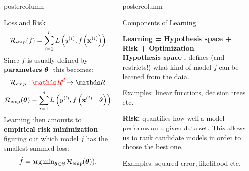 \documentclass{beamer}
\newlength{\columnheight} %
\begin{document}
\begin{frame}[fragile]{}
\begin{columns}
\begin{column}{.31\textwidth}
\begin{beamercolorbox}[center]{postercolumn}
\begin{minipage}{.98\textwidth}
{\begin{myblock}{Loss and Risk}
            $$\mathcal{R}_{\text{emp}}(f) = \sum\limits_{i=1}^n L\left(y^{(i)}, f\left(\mathbf{x}^{(i)}\right)\right)$$ 
          Since $f$ is usually defined by \textbf{parameters} $\bm{\theta}$, this becomes:
            $$\risk_{emp} : \textcolor{red}{\R^d} \to \R$$
            $$\mathcal{R}_{\text{emp}}(\bm{\theta})  =  \sum\limits_{i=1}^n L\left(y^{(i)}, f\left(\mathbf{x}^{(i)} ~|~ \bm{\theta}\right)\right) $$
            \hspace*{1ex}Learning then amounts to \textbf{empirical risk minimization} -- figuring out \hspace*{1ex}which model $f$ has the smallest summed loss:$$\hat{f} = \operatorname{arg\,min}_{\bm{\theta} \in \Theta} \mathcal{R}_{\text{emp}}(\bm{\theta})).$$
				  \end{myblock}
				}
			\end{minipage}
		\end{beamercolorbox}
	\end{column}
	\begin{column}{.31\textwidth}
		\begin{beamercolorbox}[center]{postercolumn}
			\begin{minipage}{.98\textwidth}
				\parbox[t][\columnheight]{\textwidth}{
          \begin{myblock}{Components of Learning}
  
            \textbf{Learning = Hypothesis space + Risk  + Optimization}. \\
        
            \textbf{Hypothesis space : } defines (and restricts!) what kind of model $f$
        can be learned from the data.
            
            \hspace*{1ex} Examples: linear functions, decision trees etc.
          
          \vspace*{0.5ex}
          
          \textbf{Risk: } quantifies how well a model performs on a given
        data set. This allows us to rank candidate models in order to choose the best one.
        
          \hspace*{1ex} Examples: squared error, likelihood etc.
          
          \vspace*{0.5ex}
          

\end{myblock}}
\end{minipage}
\end{beamercolorbox}
\end{column}
\end{columns}
\end{frame}
\end{document}
